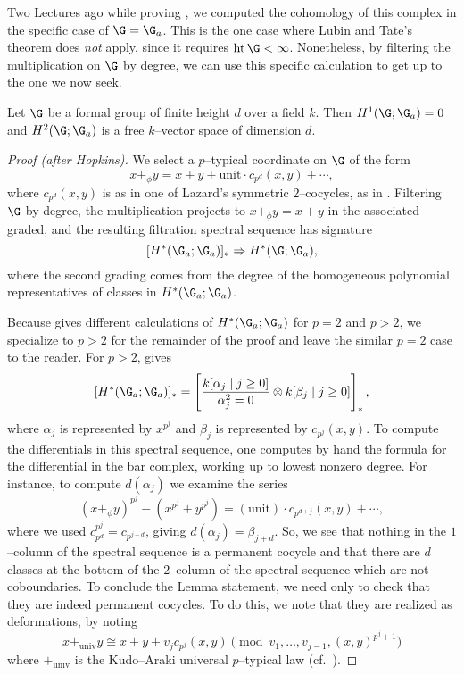 Two Lectures ago while proving , we computed the cohomology of this complex in the specific case of \(\G = \G_a\).  This is the one case where Lubin and Tate's theorem does \emph{not} apply, since it requires \(\height \G < \infty\).  Nonetheless, by filtering the multiplication on \(\G\) by degree, we can use this specific calculation to get up to the one we now seek.

\begin{lemma}\label{CalculationOfLTTangentSpace}
Let \(\G\) be a formal group of finite height \(d\) over a field \(k\).  Then \(H^1(\G; \G_a) = 0\) and \(H^2(\G; \G_a)\) is a free \(k\)--vector space of dimension \(d\).
\end{lemma}
\begin{proof}[Proof (after Hopkins)]
We select a \(p\)--typical coordinate on \(\G\) of the form \[x +_\phi y = x + y + \mathrm{unit} \cdot c_{p^d}(x, y) + \cdots,\] where \(c_{p^d}(x, y)\) is as in one of Lazard's symmetric \(2\)--cocycles, as in .  Filtering \(\G\) by degree, the multiplication projects to \(x +_\phi y = x + y\) in the associated graded, and the resulting filtration spectral sequence has signature \[[H^*(\G_a; \G_a)]_* \Rightarrow H^*(\G; \G_a),\] where the second grading comes from the degree of the homogeneous polynomial representatives of classes in \(H^*(\G_a; \G_a)\).

Because  gives different calculations of \(H^*(\G_a; \G_a)\) for \(p = 2\) and \(p > 2\), we specialize to \(p > 2\) for the remainder of the proof and leave the similar \(p = 2\) case to the reader.  For \(p > 2\),  gives \[[H^*(\G_a; \G_a)]_* = \left[\frac{k[\alpha_j \mid j \ge 0]}{\alpha_j^2 = 0} \otimes k[\beta_j \mid j \ge 0]\right]_*,\] where \(\alpha_j\) is represented by \(x^{p^j}\) and \(\beta_j\) is represented by \(c_{p^j}(x, y)\).  To compute the differentials in this spectral sequence, one computes by hand the formula for the differential in the bar complex, working up to lowest nonzero degree.  For instance, to compute \(d(\alpha_j)\) we examine the series \[(x +_\phi y)^{p^j} - (x^{p^j} + y^{p^j}) = (\text{unit}) \cdot c_{p^{d + j}}(x, y) + \cdots,\] where we used \(c_{p^d}^{p^j} = c_{p^{j+d}}\), giving \(d(\alpha_j) = \beta_{j+d}\).  So, we see that nothing in the \(1\)--column of the spectral sequence is a permanent cocycle and that there are \(d\) classes at the bottom of the \(2\)--column of the spectral sequence which are not coboundaries.  To conclude the Lemma statement, we need only to check that they are indeed permanent cocycles.  To do this, we note that they are realized as deformations, by noting \[x +_{\mathrm{univ}} y \cong x + y + v_j c_{p^j}(x, y) \pmod{v_1, \ldots, v_{j-1}, (x, y)^{p^j+1}}\] where \(+_{\mathrm{univ}}\) is the Kudo--Araki universal \(p\)--typical law (cf.\ \cite[Proposition 1.1]{LubinTate}).
\end{proof}

